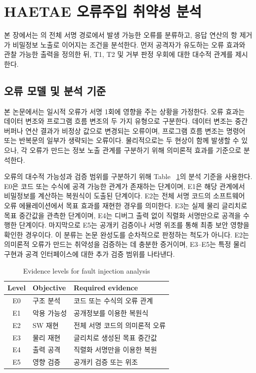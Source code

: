 \section{HAETAE 오류주입 취약성 분석}
\label{sec:analysis}

본 장에서는 의 전체 서명 경로에서 발생 가능한 오류를
분류하고, 응답 연산의 항 제거가 비밀정보 노출로 이어지는 조건을
분석한다. 먼저 공격자가 유도하는 오류 효과와 관찰 가능한 출력을
정의한 뒤, T1, T2 및 거부 판정 우회에 대한 대수적 관계를 제시한다.



\subsection{오류 모델 및 분석 기준}

본 논문에서는 일시적 오류가 서명 1회에 영향을 주는 상황을 가정한다.
오류 효과는 데이터 변조와 프로그램 흐름 변조의 두 가지 유형으로
구분한다. 데이터 변조는 중간 버퍼나 연산 결과가 비정상 값으로
변경되는 오류이며, 프로그램 흐름 변조는 명령어 또는 반복문의 일부가
생략되는 오류이다. 물리적으로는 두 현상이 함께 발생할 수 있으나,
각 오류가 만드는 정보 노출 관계를 구분하기 위해 의미론적 효과를
기준으로 분석한다.

오류의 대수적 가능성과 검증 범위를 구분하기 위해 Table
~\ref{tab:evidence-level}의 분석 기준을 사용한다. E0은 코드 또는
수식에 공격 가능한 관계가 존재하는 단계이며, E1은 해당 관계에서
비밀정보를 계산하는 복원식이 도출된 단계이다. E2는 전체 서명 코드의
소프트웨어 오류 에뮬레이션에서 목표 효과를 재현한 경우를 의미한다.
E3는 실제 물리 글리치로 목표 중간값을 관측한 단계이며, E4는 디버그
출력 없이 직렬화 서명만으로 공격을 수행한 단계이다. 마지막으로 E5는
공개키 검증이나 서명 위조를 통해 최종 보안 영향을 확인한 경우이다.
이 분류는 논문 완성도를 순차적으로 판정하는 척도가 아니다. E2는
의미론적 오류가 만드는 취약성을 검증하는 데 충분한 증거이며, E3--E5는
특정 물리 구현과 공격 인터페이스에 대한 추가 검증 범위를 나타낸다.

\begin{table}[H]
\centering
\caption{Evidence levels for fault injection analysis}
\label{tab:evidence-level}
\footnotesize
\begin{tabularx}{\columnwidth}{@{}c l X@{}}
\toprule
Level & Objective & Required evidence \\
\midrule
E0 & 구조 분석 & 코드 또는 수식의 오류 관계 \\
E1 & 악용 가능성 & 공개정보를 이용한 복원식 \\
E2 & SW 재현 & 전체 서명 코드의 의미론적 오류 \\
E3 & 물리 재현 & 글리치로 생성된 목표 중간값 \\
E4 & 출력 공격 & 직렬화 서명만을 이용한 복원 \\
E5 & 영향 검증 & 공개키 검증 또는 위조 \\
\bottomrule
\end{tabularx}
\end{table}

